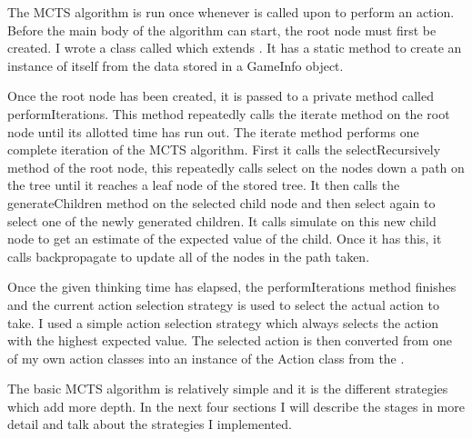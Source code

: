 The MCTS algorithm is run once whenever \mbt is called upon to perform an action. Before the main body of the algorithm can start, the root node must first be created. I wrote a class called \rootn which extends \choice. It has a static method to create an instance of itself from the data stored in a GameInfo object.

Once the root node has been created, it is passed to a private method called \mbox{performIterations}. This method repeatedly calls the iterate method on the root node until its allotted time has run out. The iterate method performs one complete iteration of the MCTS algorithm. First it calls the selectRecursively method of the root node, this repeatedly calls select on the nodes down a path on the tree until it reaches a leaf node of the stored tree. It then calls the generateChildren method on the selected child node and then select again to select one of the newly generated children. It calls simulate on this new child node to get an estimate of the expected value of the child. Once it has this, it calls backpropagate to update all of the nodes in the path taken.

Once the given thinking time has elapsed, the performIterations method finishes and the current action selection strategy is used to select the actual action to take. I used a simple action selection strategy which always selects the action with the highest expected value. The selected action is then converted from one of my own action classes into an instance of the Action class from the \meer.

The basic MCTS algorithm is relatively simple and it is the different strategies which add more depth. In the next four sections I will describe the stages in more detail and talk about the strategies I implemented. 







